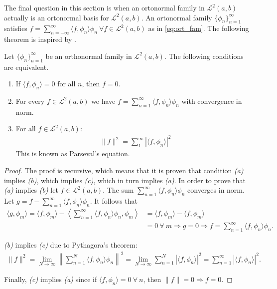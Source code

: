 The final question in this section is when an ortonormal family in $\mathcal{L}^2(a,b)$ actually is an ortonormal basis for $\mathcal{L}^2(a,b)$. An ortonormal family $\{\phi_n\}_{n=1}^\infty$ satisfies $f = \sum_{n=-\infty}^\infty \langle f, \phi_n \rangle \phi_n \ \forall f \in \mathcal{L}^2(a,b)$ as in \eqref{eq:ort_fam}. The following theorem is inspired by \cite{page 77, FAA}.

\begin{theorem} \label{theo:Fourier_series_Parseval}
Let $\{\phi_n\}_{n=1}^\infty$ be an orthonormal family in $\mathcal{L}^2(a,b)$. The following conditions are equivalent.
\begin{enumerate}[label=(\alph*)]
\item If $\langle f, \phi_n \rangle = 0$ for all $n$, then $f = 0$.
\item For every $f \in \mathcal{L}^2(a,b)$ we have $f = \sum_{n=1}^\infty \langle f, \phi_n \rangle \phi_n$ with convergence in norm.\\
\item For all $f \in \mathcal{L}^2(a,b)$:
\begin{align*}
\|f\|^2 = \sum_1^\infty |\langle f,\phi_n \rangle|^2
\end{align*}
This is known as Parseval's equation.
\end{enumerate}
\end{theorem}

\begin{proof}
The proof is recursive, which means that it is proven that condition \textit{(a)} implies \textit{(b)}, which implies \textit{(c)}, which in turn implies \textit{(a)}. In order to prove that \textit{(a)} implies \textit{(b)} let $f\in\mathcal{L}^2(a,b)$. The sum $\sum_{n=1}^\infty \langle f,\phi_n \rangle \phi_n$ converges in norm. Let $g = f - \sum_{n=1}^\infty \langle f,\phi_n \rangle \phi_n$. It follows that
\begin{align*}
\langle g,\phi_m \rangle = \langle f, \phi_m \rangle - \left\langle \sum_{n=1}^\infty \langle f,\phi_n\rangle \phi_n, \phi_m \right\rangle &= \langle f, \phi_m \rangle - \langle f, \phi_m \rangle \\
&= 0 \ \forall \ m \Rightarrow g = 0 \Rightarrow f = \sum_{n=1}^\infty \langle f,\phi_n \rangle \phi_n.
\end{align*}

\textit{(b)} implies \textit{(c)} due to Pythagora's theorem:
\begin{align*}
\|f\|^2 = \lim_{N\to\infty} \left\| \sum_{n=1}^N \langle f,\phi_n \rangle \phi_n \right\|^2 = \lim_{N\to\infty} \sum_{n=1}^N |\langle f,\phi_n \rangle|^2 = \sum_{n=1}^\infty |\langle f,\phi_n \rangle|^2.
\end{align*}

Finally, \textit{(c)} implies \textit{(a)} since if $\langle f,\phi_n \rangle = 0 \ \forall \ n$, then $\|f\| = 0 \Rightarrow f = 0$.
\end{proof}


